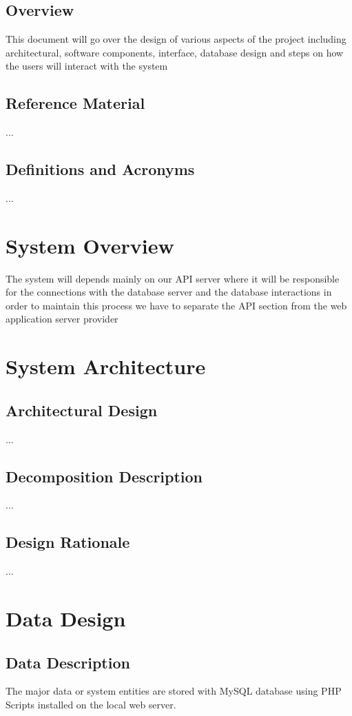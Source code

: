 \documentclass[]{article}
\begin{document}
\subsection{Overview}
This document will go over the design of various aspects of the project including architectural, software components, interface, database design and steps on how the users will interact with the system 



\subsection{Reference Material}
... 


\subsection{Definitions and Acronyms}
...

\section{System Overview}
The system will depends mainly on our API server where it will be responsible for the connections with the database server and the database interactions in order to maintain this process we have to separate the API section from the web application server provider   

\section{System Architecture}
\subsection{Architectural Design}
...


\subsection{Decomposition Description}
...


\subsection{Design Rationale}
...


\section{Data Design}
\subsection{Data Description}
The major data or system entities are stored with MySQL database using PHP Scripts installed on the local web server.
\end{document}
